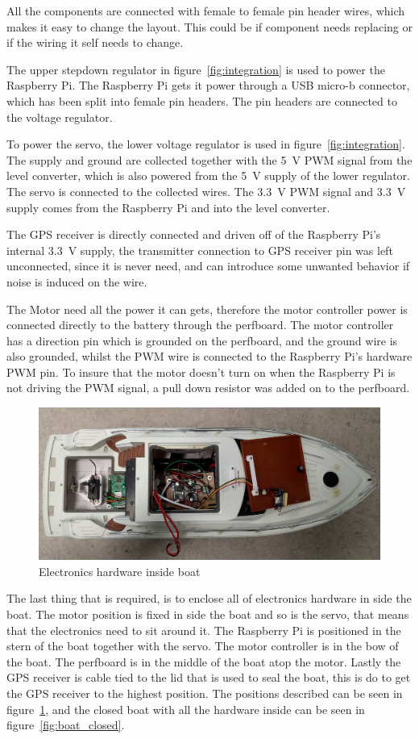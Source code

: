 All the components are connected with female to female pin header wires, which makes it easy to change the layout. This could be if component needs replacing or if the wiring it self needs to change.

The upper stepdown regulator in figure~\ref{fig:integration} is used to power the Raspberry Pi. The Raspberry Pi gets it power through a USB micro-b connector, which has been split into female pin headers. The pin headers are connected to the voltage regulator. 

To power the servo, the lower voltage regulator is used in figure~\ref{fig:integration}. The supply and ground are collected together with the 5~V PWM signal from the level converter, which is also powered from the 5~V supply of the lower regulator. The servo is connected to the collected wires. The 3.3~V PWM signal and 3.3~V supply comes from the Raspberry Pi and into the level converter.

The GPS receiver is directly connected and driven off of the Raspberry Pi's internal 3.3~V supply, the transmitter connection to GPS receiver pin was left unconnected, since it is never need, and can introduce some unwanted behavior if noise is induced on the wire.

The Motor need all the power it can gets, therefore the motor controller power is connected directly to the battery through the perfboard. The motor controller has a direction pin which is grounded on the perfboard, and the ground wire is also grounded, whilst the PWM wire is connected to the Raspberry Pi's hardware PWM pin. To insure that the motor doesn't turn on when the Raspberry Pi is not driving the PWM signal, a pull down resistor was added on to the perfboard. 

\begin{figure}[H]
\centering
\includegraphics[width=0.7\linewidth]{Images/Implementation/all_hardware_in_boat}
\caption{Electronics hardware inside boat}
\label{fig:electronics_boat}
\end{figure}

The last thing that is required, is to enclose all of electronics hardware in side the boat. The motor position is fixed in side the boat and so is the servo, that means that the electronics need to sit around it. The Raspberry Pi is positioned in the stern of the boat together with the servo. The motor controller is in the bow of the boat. The perfboard is in the middle of the boat atop the motor. Lastly the GPS receiver is cable tied to the lid that is used to seal the boat, this is do to get the GPS receiver to the highest position. The positions described can be seen in figure~\ref{fig:electronics_boat}, and the closed boat with all the hardware inside can be seen in figure~\ref{fig:boat_closed}.

